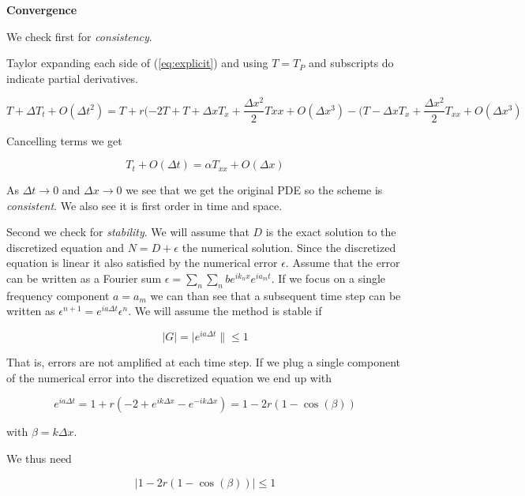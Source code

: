 \documentclass{article}
\begin{document}
\textbf{Convergence}

We check first for \emph{consistency}.

Taylor expanding each side of (\ref{eq:explicit}) and using $T= T_P$ and subscripts do indicate partial derivatives.

\begin{equation}
 	T + \Delta T_t + O(\Delta t^2) = T + r(-2T + T + \Delta x T_x + \frac{\Delta x^2}{2}Txx + O(\Delta x^3) - ( T - \Delta x T_x + \frac{\Delta x^2}{2}T_{xx} + O(\Delta x^3)
\end{equation}

Cancelling terms we get

\begin{equation}
 	T_t + O(\Delta t) = \alpha T_{xx} + O(\Delta x)
\end{equation}

As $\Delta t \rightarrow 0 $ and $\Delta x \rightarrow 0 $ we see that we get the original PDE so the scheme is \emph{consistent}. We also see it is first order in time and space. 

Second we check for \emph{stability}. We will assume that $D$ is the exact solution to the discretized equation and $N = D+\epsilon$ the numerical solution. Since the discretized equation is linear it also satisfied by the numerical error $\epsilon$. Assume that the error can be written as a Fourier sum $\epsilon = \sum_n\sum_n b e^{ik_nx}e^{ia_mt}$. If we focus on a single frequency component $a = a_m$  we can than see that a subsequent time step can be written as $\epsilon^{n+1}=e^{ia\Delta t}\epsilon^n$. We will assume the method is stable if 

\begin{equation}	
	|G| = |e^{ia\Delta t}\| \leq 1
\end{equation}

That is, errors are not amplified at each time step. If we plug a single component of the numerical error into the discretized equation we end up with

\begin{equation}
 	e^{ia\Delta t} = 1 + r(-2+e^{ik\Delta x}-e^{-ik\Delta x}) = 1 - 2r(1-\cos(\beta))
\end{equation}

with $\beta = k \Delta x$.

We thus need

\begin{equation}
	|1 - 2r(1-\cos(\beta))| \leq 1
\end{equation}
\end{document}
